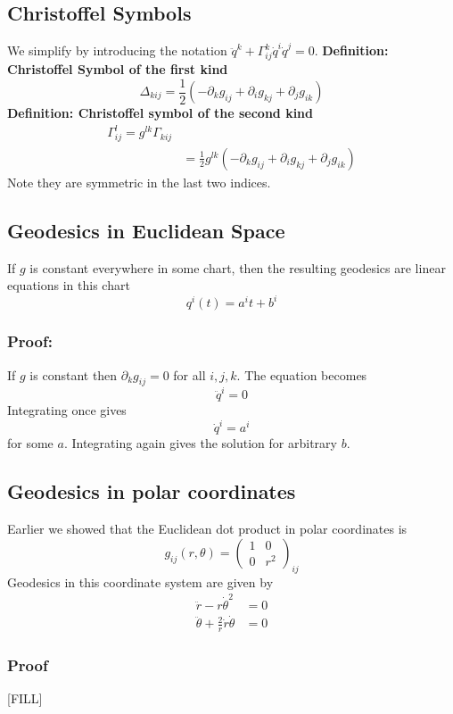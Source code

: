 \documentclass[10pt]{article}
\begin{document}
\subsection*{Christoffel Symbols}
We simplify by introducing the notation $\ddot{q}^k + \Gamma_{ij}^k \dot{q}^i \dot{q}^j = 0$.
\textbf{Definition: Christoffel Symbol of the first kind}
\[\Delta_{kij} = \frac{1}{2} (-\partial_k g_{ij} + \partial_i g_{kj} + \partial_j g_{ik})\]
\textbf{Definition: Christoffel symbol of the second kind}
\begin{align*}
    \Gamma_{ij}^l = g^{lk} \Gamma_{kij}\\
    &= \frac{1}{2} g^{lk} (-\partial_k g_{ij} + \partial_i g_{kj} + \partial_j g_{ik})
\end{align*}
Note they are symmetric in the last two indices.

\subsection*{Geodesics in Euclidean Space}
If $g$ is constant everywhere in some chart, then the resulting geodesics are linear equations in this chart
\[q^i(t) = a^i t + b^i\]
\subsubsection*{Proof:}
If $g$ is constant then $\partial_k g_{ij} = 0$ for all $i, j, k$.  The equation becomes
\[\ddot{q}^i = 0\]
Integrating once gives
\[\dot{q}^i = a^i\]
for some $a$.  Integrating again gives the solution for arbitrary $b$.

\subsection*{Geodesics in polar coordinates}
Earlier we showed that the Euclidean dot product in polar coordinates is
\[g_{ij} (r, \theta) = \begin{pmatrix} 1 & 0 \\ 0 & r^2 \end{pmatrix}_{ij}\]
Geodesics in this coordinate system are given by
\begin{align*}
    \ddot{r} - r \dot{\theta}^2 &= 0\\
    \ddot{\theta} + \frac{2}{r} \dot{r} \dot{\theta} &= 0
\end{align*}

\subsubsection*{Proof}
[FILL]
\end{document}

